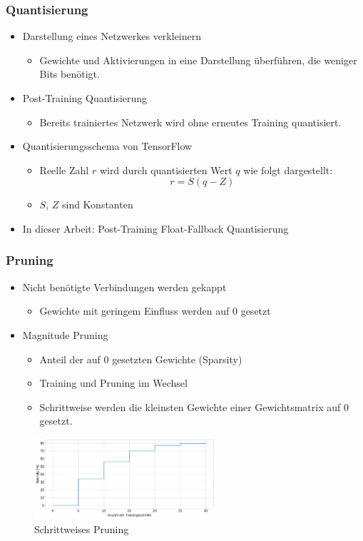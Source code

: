 \documentclass{beamer}
\begin{document}
\begin{frame}
\frametitle{Quantisierung}

\begin{itemize}
	\item Darstellung eines Netzwerkes verkleinern
	\begin{itemize}
		\item Gewichte und Aktivierungen in eine Darstellung überführen, die weniger Bits benötigt.
	\end{itemize}
	\item Post-Training Quantisierung
	\begin{itemize}
		\item Bereits trainiertes Netzwerk wird ohne erneutes Training quantisiert.
	\end{itemize}
	\item Quantisierungsschema von TensorFlow \cite{jacob_quantization_2017}
	\begin{itemize}
		\item Reelle Zahl $r$ wird durch quantisierten Wert $q$ wie folgt dargestellt:
		\[r = S(q - Z)\]
		\item $S$, $Z$ sind Konstanten
	\end{itemize}
	\item In dieser Arbeit: Post-Training Float-Fallback Quantisierung
\end{itemize}

\end{frame}


\begin{frame}
\frametitle{Pruning}

\begin{itemize}
	\item Nicht benötigte Verbindungen werden gekappt
	\begin{itemize}
		\item Gewichte mit geringem Einfluss werden auf 0 gesetzt
	\end{itemize}
	\item Magnitude Pruning \cite{zhu_prune_2017}
	\begin{itemize}
		\item Anteil der auf 0 gesetzten Gewichte (Sparsity)
		\item Training und Pruning im Wechsel
		\item Schrittweise werden die kleinsten Gewichte einer Gewichtsmatrix auf 0 gesetzt. 
	\end{itemize}
\end{itemize}

\begin{figure}
\includegraphics[width=0.6\textwidth]{img/magnitude_pruning_schedule.pdf}
\caption{Schrittweises Pruning}
\end{figure}

\end{frame}
\end{document}
